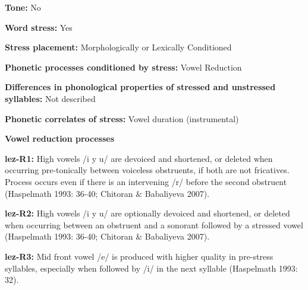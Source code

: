 \begin{styleBody}
\textbf{Tone:} No
\end{styleBody}

\begin{styleBody}
\textbf{Word stress:} Yes
\end{styleBody}

\begin{styleBody}
\textbf{Stress placement:} Morphologically or Lexically Conditioned
\end{styleBody}

\begin{styleBody}
\textbf{Phonetic processes conditioned by stress:} Vowel Reduction
\end{styleBody}

\begin{styleBody}
\textbf{Differences in phonological properties of stressed and unstressed syllables:} Not described
\end{styleBody}

\begin{styleBody}
\textbf{Phonetic correlates of stress: }Vowel duration (instrumental)
\end{styleBody}

\begin{styleBody}
\textbf{Vowel reduction processes}
\end{styleBody}

\begin{styleBody}
\textbf{lez-R1:} High vowels /i y u/ are devoiced and shortened, or deleted when occurring pre-tonically between voiceless obstruents, if both are not fricatives. Process occurs even if there is an intervening /r/ before the second obstruent (Haspelmath 1993: 36-40; Chitoran \& Babaliyeva 2007).
\end{styleBody}

\begin{styleBody}
\textbf{lez-R2:} High vowels /i y u/ are optionally devoiced and shortened, or deleted when occurring between an obstruent and a sonorant followed by a stressed vowel (Haspelmath 1993: 36-40; Chitoran \& Babaliyeva 2007).
\end{styleBody}

\begin{styleBody}
\textbf{lez-R3:} Mid front vowel /e/ is produced with higher quality in pre-stress syllables, especially when followed by /i/ in the next syllable (Haspelmath 1993: 32).
\end{styleBody}

